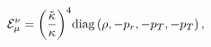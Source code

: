 \begin{equation}
{{\mathcal{E}}_\mu^\nu}={{\left({{\tilde{\kappa}}\over{\kappa}}\right)}^4}\mbox{diag}\left(\rho,-
{p_r},-{p_T},-{p_T}\right),
\end{equation}

